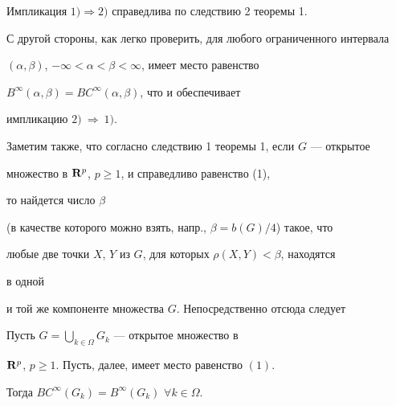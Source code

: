 \begin{pf}


Импликация $1) \Rightarrow 2)$ справедлива по следствию 2 теоремы 1.


С другой стороны, как легко проверить, для любого ограниченного интервала


$(\alpha,\beta)$, $-\infty<\alpha<\beta<\infty$, имеет место равенство


$B^{\infty}(\alpha,\beta)=BC^{\infty}(\alpha,\beta)$, что и обеспечивает


импликацию $2)~\Rightarrow~1)$.


\end{pf}





Заметим также, что согласно следствию 1 теоремы 1, если $G$ --- открытое


множество в ${\bold R}^p$, $p\geqslant 1$, и справедливо равенство (1), 


то найдется число $\beta$


(в качестве которого можно взять, напр., $\beta=b(G)/4$) такое, что


любые две точки $X$, $Y$ из $G$, для которых $\rho(X,Y)<\beta$, находятся


в одной


и той же компоненте множества $G$. Непосредственно отсюда следует








\begin{thm}


Пусть $G=\bigcup\limits_{k\in \Omega}G_k$ --- открытое множество в


${\bold R}^p$, $p\geqslant 1$. Пусть, далее, имеет место равенство $(1)$.


Тогда $BC^\infty(G_k)=B^{\infty}(G_k)$ $\forall k\in\Omega$.


\end{thm}








